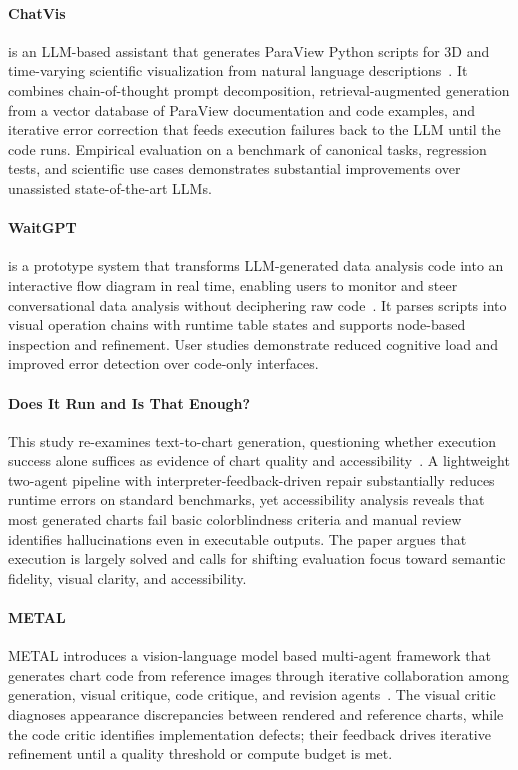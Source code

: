\paragraph{ChatVis}
is an LLM-based assistant that generates ParaView Python scripts for 3D and time-varying scientific visualization from natural language descriptions~\cite{avg250723096}. It combines chain-of-thought prompt decomposition, retrieval-augmented generation from a vector database of ParaView documentation and code examples, and iterative error correction that feeds execution failures back to the LLM until the code runs. Empirical evaluation on a benchmark of canonical tasks, regression tests, and scientific use cases demonstrates substantial improvements over unassisted state-of-the-art LLMs.


\paragraph{WaitGPT}
 is a prototype system that transforms LLM-generated data analysis code into an interactive flow diagram in real time, enabling users to monitor and steer conversational data analysis without deciphering raw code~\cite{avg240801703}. It parses scripts into visual operation chains with runtime table states and supports node-based inspection and refinement. User studies demonstrate reduced cognitive load and improved error detection over code-only interfaces.

\paragraph{Does It Run and Is That Enough?}
This study re-examines text-to-chart generation, questioning whether execution success alone suffices as evidence of chart quality and accessibility~\cite{avg250606175}.  A lightweight two-agent pipeline with interpreter-feedback-driven repair substantially reduces runtime errors on standard benchmarks, yet accessibility analysis reveals that most generated charts fail basic colorblindness criteria and manual review identifies hallucinations even in executable outputs. The paper argues that execution is largely solved and calls for shifting evaluation focus toward semantic fidelity, visual clarity, and accessibility.

\paragraph{METAL}
METAL introduces a vision-language model based multi-agent framework that generates chart code from reference images through iterative collaboration among generation, visual critique, code critique, and revision agents~\cite{li2025metal}. The visual critic diagnoses appearance discrepancies between rendered and reference charts, while the code critic identifies implementation defects; their feedback drives iterative refinement until a quality threshold or compute budget is met.

